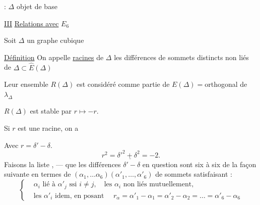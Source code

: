  : $\Delta$ objet de base

\uline{III} \uline{Relations avec} $E_6$

Soit $\Delta$ un graphe cubique

\uline{Définition} On appelle \uline{racines} de $\Delta$ les différences 
 de sommets distincts non liés de $\Delta\subset\widehat E(\Delta)$

Leur ensemble $R(\Delta)$ est considéré comme partie de $E(\Delta)={}$orthogonal de $\lambda_\Delta$

$R(\Delta)$ est stable par $r\longmapsto-r$.


 Si $r$ est une racine, on a

Avec $r=\delta'-\delta$.
\[
\underline{r^2=\delta'^2+\delta^2=-2}.
\]
Faisons la liste , ---  que les différences 
$\delta'-\delta$ en question sont six à six de la façon suivante en termes de  
$(\alpha_1,\ldots\alpha_6)(\alpha'_1,\ldots,\alpha'_6)$
 de sommets satisfaisant :
\[
\left\{\begin{aligned}
&\alpha_i\text{ lié à }\alpha'_j\text{ ssi }i\ne j,\quad
  \text{les }\alpha_i\text{ non liés mutuellement,}\\
&\text{les }\alpha'_i\text{ idem, en posant }\quad
 r_\alpha=\alpha'_1-\alpha_1=\alpha'_2-\alpha_2=\dots=\alpha'_6-\alpha_6
\end{aligned}\right.
\]


